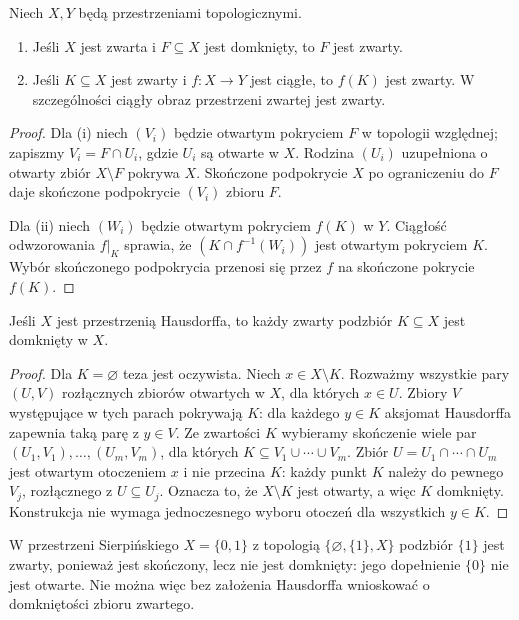 \begin{twierdzenie}
\label{thm:topog-zwartosc-trwalosc}
Niech $X,Y$ będą przestrzeniami topologicznymi.
\begin{enumerate}[label=(\roman*)]
\item Jeśli $X$ jest zwarta i $F\subseteq X$ jest
domknięty, to $F$ jest zwarty.
\item Jeśli $K\subseteq X$ jest zwarty i
$f\colon X\to Y$ jest ciągłe, to $f(K)$ jest zwarty.
W szczególności ciągły obraz przestrzeni zwartej
jest zwarty.
\end{enumerate}
\end{twierdzenie}
\begin{proof}
Dla (i) niech $(V_i)$ będzie otwartym pokryciem
$F$ w topologii względnej; zapiszmy
$V_i=F\cap U_i$, gdzie $U_i$ są otwarte w $X$.
Rodzina $(U_i)$ uzupełniona o otwarty zbiór
$X\setminus F$ pokrywa $X$. Skończone podpokrycie
$X$ po ograniczeniu do $F$ daje skończone
podpokrycie $(V_i)$ zbioru $F$.

Dla (ii) niech $(W_i)$ będzie otwartym pokryciem
$f(K)$ w $Y$. Ciągłość odwzorowania $f|_K$
sprawia, że $(K\cap f^{-1}(W_i))$ jest otwartym
pokryciem $K$. Wybór skończonego podpokrycia
przenosi się przez $f$ na skończone pokrycie $f(K)$.
\end{proof}

\begin{twierdzenie}
\label{thm:topog-zwartosc-hausdorff-domkniete}
Jeśli $X$ jest przestrzenią Hausdorffa, to każdy
zwarty podzbiór $K\subseteq X$ jest domknięty w $X$.
\end{twierdzenie}
\begin{proof}
Dla $K=\varnothing$ teza jest oczywista.
Niech $x\in X\setminus K$. Rozważmy wszystkie pary
$(U,V)$ rozłącznych zbiorów otwartych w $X$,
dla których $x\in U$. Zbiory $V$ występujące
w tych parach pokrywają $K$: dla każdego $y\in K$
aksjomat Hausdorffa zapewnia taką parę z $y\in V$.
Ze zwartości $K$ wybieramy skończenie wiele par
$(U_1,V_1),\ldots,(U_m,V_m)$, dla których
$K\subseteq V_1\cup\cdots\cup V_m$.
Zbiór $U=U_1\cap\cdots\cap U_m$ jest
otwartym otoczeniem $x$ i nie przecina $K$:
każdy punkt $K$ należy do pewnego $V_j$,
rozłącznego z $U\subseteq U_j$.
Oznacza to, że $X\setminus K$ jest otwarty,
a więc $K$ domknięty. Konstrukcja nie wymaga
jednoczesnego wyboru otoczeń dla wszystkich $y\in K$.
\end{proof}

\begin{przyklad}
\label{ex:topog-zwartosc-niedomkniety}
W przestrzeni Sierpińskiego
$X=\{0,1\}$ z topologią
$\{\varnothing,\{1\},X\}$ podzbiór $\{1\}$
jest zwarty, ponieważ jest skończony,
lecz nie jest domknięty: jego dopełnienie $\{0\}$
nie jest otwarte. Nie można więc bez założenia
Hausdorffa wnioskować o domkniętości zbioru zwartego.
\end{przyklad}

